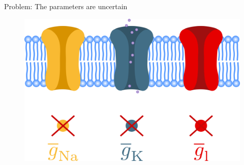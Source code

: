 \documentclass[presentation]{beamer}
\begin{document}





\begin{frame}{Problem: The parameters are uncertain}
  \begin{figure}
    \includegraphics[width=1\textwidth]{not_deterministic_channels.png}
  \end{figure}

\end{frame}






\end{document}
